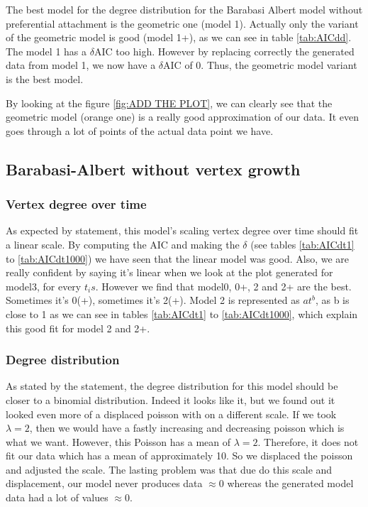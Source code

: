 \documentclass{article}
\begin{document}
The best model for the degree distribution for the Barabasi Albert model without
preferential attachment is the geometric one (model 1). Actually only the
variant of the geometric model is good (model 1+), as we can see in table
\ref{tab:AICdd}. The model 1 has a $\delta$AIC too high. However by replacing
correctly the generated data from model 1, we now have a $\delta$AIC of 0.
Thus, the geometric model variant is the best model.

By looking at the figure \ref{fig:ADD THE PLOT}, we can clearly see that
the geometric model (orange one)
is a really good approximation of our data. It even goes through a lot of
points of the actual data point we have.



\subsection{Barabasi-Albert without vertex growth}

\subsubsection{Vertex degree over time}

As expected by statement, this model's scaling vertex degree over time should
fit a linear scale. By computing the AIC and making the $\delta$ (see tables
\ref{tab:AICdt1} to \ref{tab:AICdt1000}) we have seen that the linear model
was good. Also, we are really confident by saying it's linear when we look at
the plot generated for model3, for every $t_is$. However we find that model0,
0+, 2 and 2+ are the best. Sometimes it's 0(+), sometimes it's 2(+). Model 2 is
represented as $at^b$, as b is close to 1 as we can see in tables
\ref{tab:AICdt1} to \ref{tab:AICdt1000}, which explain this good fit for model
2 and 2+.

\subsubsection{Degree distribution}

As stated by the statement, the degree distribution for this model should be
closer to a binomial distribution. Indeed it looks like it, but we found out it
looked even more of a displaced poisson with on a different scale. If we took
$\lambda = 2$, then we would have a fastly increasing and decreasing poisson
which is what we want. However, this Poisson has a mean of $\lambda = 2$.
Therefore, it does not fit our data which has a mean of approximately 10.
So we displaced the poisson and adjusted the scale. The lasting problem was that
due do this scale and displacement, our model never produces data $\approx 0$
whereas the generated model data had a lot of values $\approx 0$.
\end{document}
